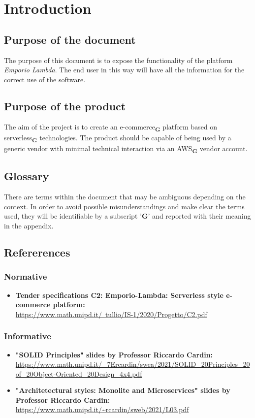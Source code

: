 \section{Introduction}
\subsection{Purpose of the document}
The purpose of this document is to expose the functionality of the platform \textit{Emporio Lambda}. The end user in this way will have all the information for the correct use of the software.
\subsection{Purpose of the product}
The aim of the project is to create an e-commerce\textsubscript{\textbf{G}} platform based on serverless\textsubscript{\textbf{G}} technologies.
The product should be capable of being used by a generic vendor with minimal technical interaction
via an AWS\textsubscript{\textbf{G}} vendor account.
\subsection{Glossary}
There are terms within the document that may be ambiguous depending on the context. In order to avoid possible misunderstandings
and make clear the terms used, they will be identifiable by a subscript '\textbf{G}' and reported with their meaning in the appendix.
\subsection{Refererences}
\subsubsection{Normative}
\begin{itemize}
    \item \textbf{Tender specifications C2: Emporio-Lambda: Serverless style e-commerce platform:} \\ \href{https://www.math.unipd.it/~tullio/IS-1/2020/Progetto/C2.pdf}{https://www.math.unipd.it/~tullio/IS-1/2020/Progetto/C2.pdf}
\end{itemize}
\subsubsection{Informative}
\begin{itemize}
    \item \textbf{"SOLID Principles" slides by Professor Riccardo Cardin:} \\
          \url{
              https://www.math.unipd.it/_7Ercardin/swea/2021/SOLID_20Principles_20of_20Object-Oriented_20Design_4x4.pdf}
    \item \textbf{"Architetectural styles: Monolite and Microservices" slides by Professor Riccardo Cardin:} \\
          \url{https://www.math.unipd.it/~rcardin/sweb/2021/L03.pdf}
\end{itemize}